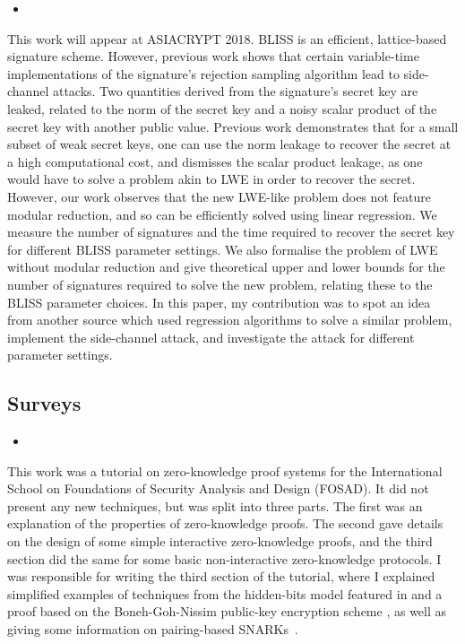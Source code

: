 \begin{itemize}
\item {}
\end{itemize}

This work will appear at ASIACRYPT 2018. BLISS \cite{DucasDLL13} is an efficient, lattice-based signature scheme. However, previous work \cite{EspitauFGT17} shows that certain variable-time implementations of the signature's rejection sampling algorithm lead to side-channel attacks. Two quantities derived from the signature's secret key are leaked, related to the norm of the secret key and a noisy scalar product of the secret key with another public value. Previous work \cite{EspitauFGT17} demonstrates that for a small subset of weak secret keys, one can use the norm leakage to recover the secret at a high computational cost, and dismisses the scalar product leakage, as one would have to solve a problem akin to LWE in order to recover the secret. However, our work observes that the new LWE-like problem does not feature modular reduction, and so can be efficiently solved using linear regression. We measure the number of signatures and the time required to recover the secret key for different BLISS parameter settings. We also formalise the problem of LWE without modular reduction and give theoretical upper and lower bounds for the number of signatures required to solve the new problem, relating these to the BLISS parameter choices. In this paper, my contribution was to spot an idea from another source which used regression algorithms to solve a similar problem, implement the side-channel attack, and investigate the attack for different parameter settings.

\subsection*{Surveys}

\begin{itemize}
\item {}
\end{itemize}

This work was a tutorial on zero-knowledge proof systems for the International School on Foundations of Security Analysis and Design (FOSAD). It did not present any new techniques, but was split into three parts. The first was an explanation of the properties of zero-knowledge proofs. The second gave details on the design of some simple interactive zero-knowledge proofs, and the third section did the same for some basic non-interactive zero-knowledge protocols. I was responsible for writing the third section of the tutorial, where I explained simplified examples of techniques from the hidden-bits model featured in \cite{Groth2010a} and a proof \cite{GOS12} based on the Boneh-Goh-Nissim public-key encryption scheme \cite{BonehGN05}, as well as giving some information on pairing-based SNARKs~\cite{Groth2010b,Lip12,Bitansky2012,Gennaro2013,Bitansky2013,PHGR13, C:BCGTV13,BCTV14}.

